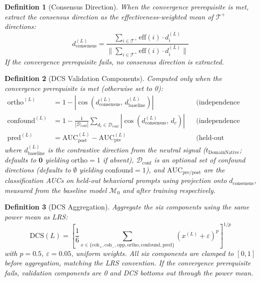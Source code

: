 \documentclass[11pt]{article}
\newtheorem{definition}{Definition}[section]
\begin{document}
\begin{definition}[Consensus Direction]
\label{def:consensus-direction}
When the convergence prerequisite is met, extract the consensus direction as the effectiveness-weighted mean of $\mathcal{T}^+$ directions:
\begin{equation}
d^{(L)}_{\text{consensus}} = \frac{\sum_{i \in \mathcal{T}^+} \text{eff}(i) \cdot d^{(L)}_i}{\|\sum_{i \in \mathcal{T}^+} \text{eff}(i) \cdot d^{(L)}_i\|}
\end{equation}
If the convergence prerequisite fails, no consensus direction is extracted.
\end{definition}

\begin{definition}[DCS Validation Components]
\label{def:dcs-validation}
Computed only when the convergence prerequisite is met (otherwise set to 0):
\begin{align}
\text{ortho}^{(L)} &= 1 - |\cos(d^{(L)}_{\text{consensus}},\, d^{(L)}_{\text{baseline}})| & &\text{(independence from baseline)} \\[0.5em]
\text{confound}^{(L)} &= 1 - \frac{1}{|\mathcal{D}_{\text{conf}}|}\sum_{d_c \in \mathcal{D}_{\text{conf}}} |\cos(d^{(L)}_{\text{consensus}},\, d_c)| & &\text{(independence from confounds)} \\[0.5em]
\text{pred}^{(L)} &= \text{AUC}_{\text{post}}^{(L)} - \text{AUC}_{\text{pre}}^{(L)} & &\text{(held-out prediction gain)}
\end{align}
where $d^{(L)}_{\text{baseline}}$ is the contrastive direction from the neutral signal ($t_{\text{DomainNative}}$; defaults to $\mathbf{0}$ yielding $\text{ortho} = 1$ if absent), $\mathcal{D}_{\text{conf}}$ is an optional set of confound directions (defaults to $\emptyset$ yielding $\text{confound} = 1$), and $\text{AUC}_{\text{pre/post}}$ are the classification AUCs on held-out behavioral prompts using projection onto $d_{\text{consensus}}$, measured from the baseline model $\mathcal{M}_0$ and after training respectively.
\end{definition}

\begin{definition}[DCS Aggregation]
\label{def:dcs-aggregation}
Aggregate the six components using the same power mean as LRS:
\begin{equation}
\text{DCS}(L) = \left[\frac{1}{6}\sum_{x \in \{\text{coh}_+, \text{coh}_-, \text{opp}, \text{ortho}, \text{confound}, \text{pred}\}} (x^{(L)} + \varepsilon)^p\right]^{1/p}
\end{equation}
with $p = 0.5$, $\varepsilon = 0.05$, uniform weights. All six components are clamped to $[0, 1]$ before aggregation, matching the LRS convention. If the convergence prerequisite fails, validation components are 0 and DCS bottoms out through the power mean.
\end{definition}
\end{document}

